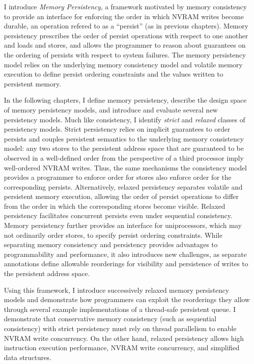 I introduce \emph{Memory Persistency}, a framework motivated by memory consistency to provide an interface for enforcing the order in which NVRAM writes become durable, an operation refered to as a ``persist'' (as in previous chapters).
Memory persistency prescribes the order of persist operations with respect to one another and loads and stores, and allows the programmer to reason about guarantees on the ordering of persists with respect to system failures.
The memory persistency model relies on the underlying memory consistency model and volatile memory execution to define persist ordering constraints and the values written to persistent memory.

In the following chapters, I define memory persistency, describe the design space of memory persistency models, and introduce and evaluate several new persistency models.
Much like consistency, I identify \emph{strict} and \emph{relaxed} classes of persistency models.
Strict persistency relies on implicit guarantees to order persists and couples persistent semantics to the underlying memory consistency model: any two stores to the persistent address space that are guaranteed to be observed in a well-defined order from the perspective of a third processor imply well-ordered NVRAM writes.
Thus, the same mechanisms the consistency model provides a programmer to enforce order for stores also enforce order for the corresponding persists. 
Alternatively, relaxed persistency separates volatile and persistent memory execution, allowing the order of persist operations to differ from the order in which the corresponding stores become visible.
Relaxed persistency facilitates concurrent persists even under sequential consistency.
Memory persistency further provides an interface for uniprocessors, which may not ordinarily order stores, to specify persist ordering constraints.
While separating memory consistency and persistency provides advantages to programmability and performance, it also introduces new challenges, as separate annotations define allowable reorderings for visibility and persistence of writes to the persistent address space.

Using this framework, I introduce successively relaxed memory persistency models and demonstrate how programmers can exploit the reorderings they allow through several example implementations of a thread-safe persistent queue.
I demonstrate that conservative memory consistency (such as sequential consistency) with strict persistency must rely on thread parallelism to enable NVRAM write concurrency.
On the other hand, relaxed persistency allows high instruction execution performance, NVRAM write concurrency, and simplified data structures.

